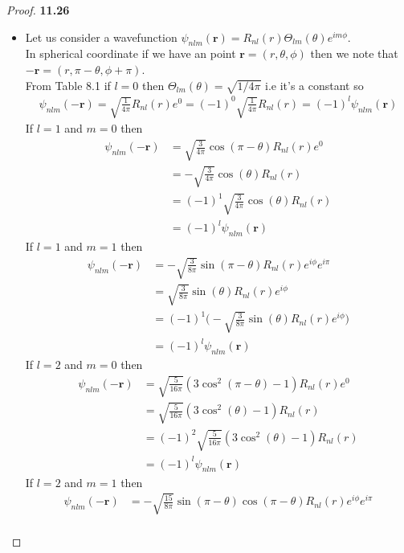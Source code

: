 \documentclass[11pt]{article}
\theoremstyle{definition}
\begin{document}
\cleardoublepage
\begin{proof}{\textbf{11.26}}\\
\begin{itemize}
\item [\textbf{(a)}] Let us consider a wavefunction 
$\psi_{nlm}(\bm{r}) = R_{nl}(r)\Theta_{lm}(\theta)e^{im\phi}$.\\
In spherical coordinate if we have an point $\bm{r} = (r, \theta, \phi)$ then 
we note that $-\bm{r} = (r, \pi - \theta, \phi + \pi)$.\\
From Table 8.1 if $l = 0$ then $\Theta_{lm}(\theta) = \sqrt{1/4\pi}$ i.e it's a
constant so
\begin{align*}
    \psi_{nlm}(-\bm{r}) = \sqrt{\frac{1}{4\pi}}R_{nl}(r)e^{0}
    = (-1)^0\sqrt{\frac{1}{4\pi}}R_{nl}(r)
    = (-1)^{l}\psi_{nlm}(\bm{r})
\end{align*}
If $l = 1$ and $m = 0$ then
\begin{align*}
    \psi_{nlm}(-\bm{r})
    &= \sqrt{\frac{3}{4\pi}}\cos(\pi - \theta) R_{nl}(r)e^{0} \\
    &= -\sqrt{\frac{3}{4\pi}}\cos(\theta) R_{nl}(r) \\
    &= (-1)^1\sqrt{\frac{3}{4\pi}}\cos(\theta) R_{nl}(r) \\
    &= (-1)^l\psi_{nlm}(\bm{r})
\end{align*}
If $l = 1$ and $m = 1$ then
\begin{align*}
    \psi_{nlm}(-\bm{r})
    &= -\sqrt{\frac{3}{8\pi}}\sin(\pi - \theta) R_{nl}(r)e^{i\phi}e^{i\pi} \\
    &= \sqrt{\frac{3}{8\pi}}\sin(\theta) R_{nl}(r)e^{i\phi}\\
    &= (-1)^1 \bigg(-\sqrt{\frac{3}{8\pi}}\sin(\theta) R_{nl}(r)e^{i\phi}\bigg) \\
    &= (-1)^l\psi_{nlm}(\bm{r})
\end{align*}
If $l = 2$ and $m = 0$ then
\begin{align*}
    \psi_{nlm}(-\bm{r})
    &= \sqrt{\frac{5}{16\pi}}(3\cos^2(\pi - \theta) - 1)R_{nl}(r)e^{0} \\
    &= \sqrt{\frac{5}{16\pi}}(3\cos^2(\theta) - 1)R_{nl}(r) \\
    &= (-1)^2\sqrt{\frac{5}{16\pi}}(3\cos^2(\theta) - 1)R_{nl}(r) \\
    &= (-1)^l\psi_{nlm}(\bm{r})
\end{align*}
If $l = 2$ and $m = 1$ then
\begin{align*}
    \psi_{nlm}(-\bm{r})
    &= -\sqrt{\frac{15}{8\pi}}\sin(\pi -\theta)\cos(\pi - \theta)R_{nl}(r)e^{i\phi}e^{i\pi} \\

\end{align*}
\end{itemize}
\end{proof}
\end{document}
